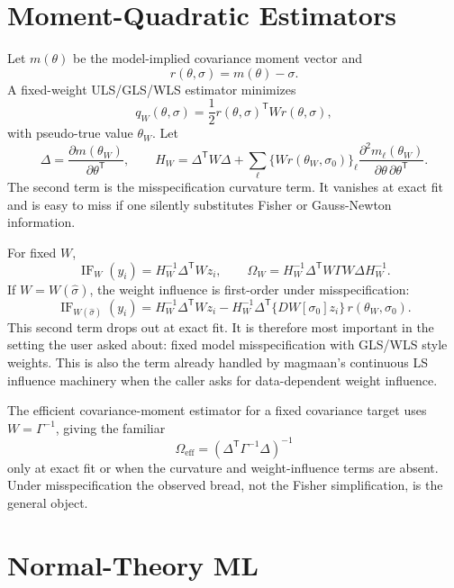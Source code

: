 \documentclass[11pt]{article}
\newcommand{\T}{^{\mathsf T}}
\newcommand{\IF}{\operatorname{IF}}
\theoremstyle{plain}
\theoremstyle{remark}
\begin{document}
\section{Moment-Quadratic Estimators}

Let \(m(\theta)\) be the model-implied covariance moment vector and
\[
  r(\theta,\sigma)=m(\theta)-\sigma.
\]
A fixed-weight ULS/GLS/WLS estimator minimizes
\[
  q_W(\theta,\sigma)=\frac12 r(\theta,\sigma)\T W r(\theta,\sigma),
\]
with pseudo-true value \(\theta_W\). Let
\[
  \Delta=\frac{\partial m(\theta_W)}{\partial\theta\T},
  \qquad
  H_W
    =
  \Delta\T W\Delta
    +\sum_{\ell}\{Wr(\theta_W,\sigma_0)\}_{\ell}
       \frac{\partial^2 m_\ell(\theta_W)}
            {\partial\theta\,\partial\theta\T}.
\]
The second term is the misspecification curvature term. It vanishes at exact
fit and is easy to miss if one silently substitutes Fisher or Gauss-Newton
information.

For fixed \(W\),
\[
  \IF_W(y_i)=
  H_W^{-1}\Delta\T W z_i,
  \qquad
  \Omega_W
    =
  H_W^{-1}\Delta\T W\Gamma W\Delta H_W^{-1}.
\]
If \(W=W(\hat\sigma)\), the weight influence is first-order under
misspecification:
\[
  \IF_{W(\hat\sigma)}(y_i)
    =
  H_W^{-1}\Delta\T W z_i
  -
  H_W^{-1}\Delta\T \{DW[\sigma_0]z_i\}\,r(\theta_W,\sigma_0).
\]
This second term drops out at exact fit. It is therefore most important in the
setting the user asked about: fixed model misspecification with GLS/WLS style
weights. This is also the term already handled by magmaan's continuous LS
influence machinery when the caller asks for data-dependent weight influence.

The efficient covariance-moment estimator for a fixed covariance target uses
\(W=\Gamma^{-1}\), giving the familiar
\[
  \Omega_{\mathrm{eff}}
    =
  (\Delta\T\Gamma^{-1}\Delta)^{-1}
\]
only at exact fit or when the curvature and weight-influence terms are absent.
Under misspecification the observed bread, not the Fisher simplification, is the
general object.

\section{Normal-Theory ML}
\end{document}
